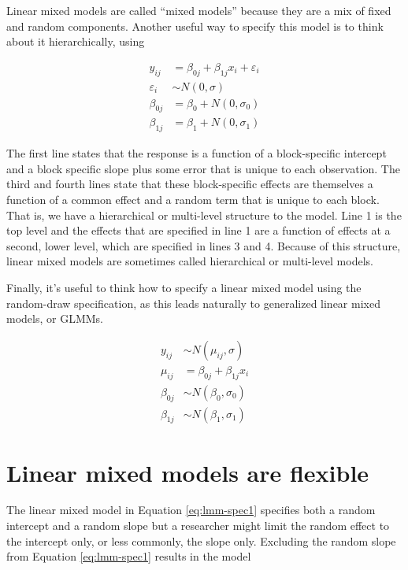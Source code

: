 \documentclass[]{book}
\begin{document}
Linear mixed models are called ``mixed models'' because they are a mix
of fixed and random components. Another useful way to specify this model
is to think about it hierarchically, using

\begin{align}
y_{ij} &= \beta_{0j} + \beta_{1j}x_i + \varepsilon_i \\
\varepsilon_i &\sim N(0, \sigma) \\
\beta_{0j} &= \beta_{0} + N(0, \sigma_{0}) \\
\beta_{1j} &= \beta_{1} + N(0, \sigma_{1})
\label{eq:lmm-spec2}
\end{align}

The first line states that the response is a function of a
block-specific intercept and a block specific slope plus some error that
is unique to each observation. The third and fourth lines state that
these block-specific effects are themselves a function of a common
effect and a random term that is unique to each block. That is, we have
a hierarchical or multi-level structure to the model. Line 1 is the top
level and the effects that are specified in line 1 are a function of
effects at a second, lower level, which are specified in lines 3 and 4.
Because of this structure, linear mixed models are sometimes called
hierarchical or multi-level models.

Finally, it's useful to think how to specify a linear mixed model using
the random-draw specification, as this leads naturally to generalized
linear mixed models, or GLMMs.

\begin{align}
y_{ij} &\sim N(\mu_{ij}, \sigma) \\
\mu_{ij} &=\beta_{0j} + \beta_{1j}x_i \\
\beta_{0j} &\sim N(\beta_0, \sigma_0) \\
\beta_{1j} &\sim N(\beta_1, \sigma_1)
\label{eq:lmm-spec3}
\end{align}

\section{Linear mixed models are
flexible}\label{linear-mixed-models-are-flexible}

The linear mixed model in Equation \eqref{eq:lmm-spec1} specifies both a
random intercept and a random slope but a researcher might limit the
random effect to the intercept only, or less commonly, the slope only.
Excluding the random slope from Equation \eqref{eq:lmm-spec1} results in
the model
\end{document}
